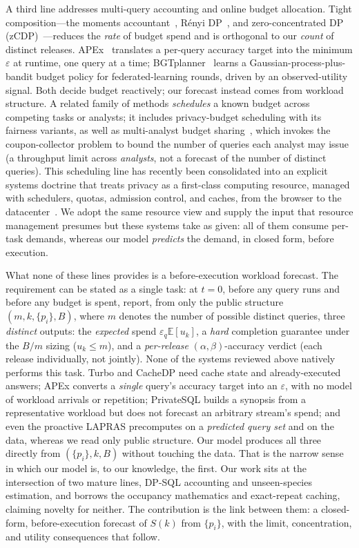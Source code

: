 \documentclass[sigconf,nonacm]{acmart}
\newcommand{\eps}{\varepsilon}
\newcommand{\E}{\mathbb{E}}
\begin{document}
A third line addresses multi-query accounting and online budget allocation. Tight composition---the moments accountant~\cite{abadi2016deep}, R\'enyi DP~\cite{mironov2017renyi}, and zero-concentrated DP (zCDP)~\cite{bun2016concentrated}---reduces the \emph{rate} of budget spend and is orthogonal to our \emph{count} of distinct releases. APEx~\cite{ge2019apex} translates a per-query accuracy target into the minimum $\eps$ at runtime, one query at a time; BGTplanner~\cite{zhang2024bgtplanner} learns a Gaussian-process-plus-bandit budget policy for federated-learning rounds, driven by an observed-utility signal. Both decide budget reactively; our forecast instead comes from workload structure. A related family of methods \emph{schedules} a known budget across competing tasks or analysts; it includes privacy-budget scheduling with its fairness variants, as well as multi-analyst budget sharing~\cite{pujol2023multianalyst}, which invokes the coupon-collector problem to bound the number of queries each analyst may issue (a throughput limit across \emph{analysts}, not a forecast of the number of distinct queries). This scheduling line has recently been consolidated into an explicit systems doctrine that treats privacy as a first-class computing resource, managed with schedulers, quotas, admission control, and caches, from the browser to the datacenter~\cite{tholoniat2025thesis}. We adopt the same resource view and supply the input that resource management presumes but these systems take as given: all of them consume per-task demands, whereas our model \emph{predicts} the demand, in closed form, before execution.

What none of these lines provides is a before-execution workload forecast. The requirement can be stated as a single task: at $t{=}0$, before any query runs and before any budget is spent, report, from only the public structure $(m,k,\{p_i\},B)$, where $m$ denotes the number of possible distinct queries, three \emph{distinct} outputs: the \emph{expected} spend $\eps_q\E[u_k]$, a \emph{hard} completion guarantee under the $B/m$ sizing ($u_k\le m$), and a \emph{per-release} $(\alpha,\beta)$-accuracy verdict (each release individually, not jointly). None of the systems reviewed above natively performs this task. Turbo and CacheDP need cache state and already-executed answers; APEx converts a \emph{single} query's accuracy target into an $\eps$, with no model of workload arrivals or repetition; PrivateSQL builds a synopsis from a representative workload but does not forecast an arbitrary stream's spend; and even the proactive LAPRAS precomputes on a \emph{predicted query set} and on the data, whereas we read only public structure. Our model produces all three directly from $(\{p_i\},k,B)$ without touching the data. That is the narrow sense in which our model is, to our knowledge, the first. Our work sits at the intersection of two mature lines, DP-SQL accounting and unseen-species estimation, and borrows the occupancy mathematics and exact-repeat caching, claiming novelty for neither. The contribution is the link between them: a closed-form, before-execution forecast of $S(k)$ from $\{p_i\}$, with the limit, concentration, and utility consequences that follow.
\end{document}
